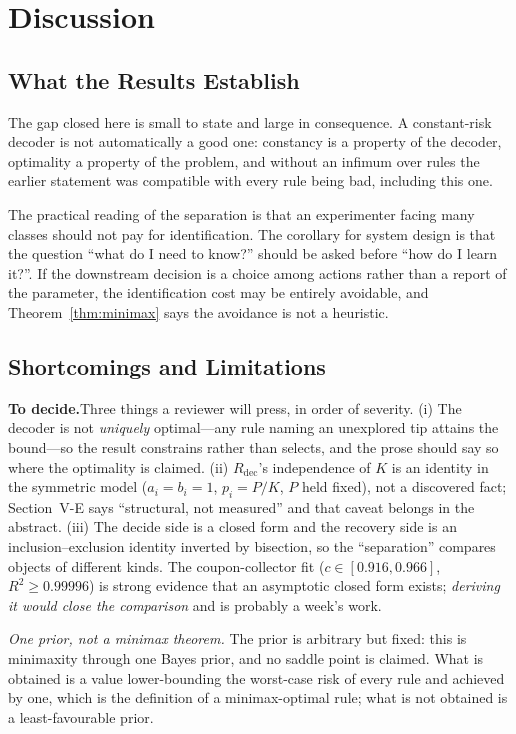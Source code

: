 \documentclass[conference]{IEEEtran}
\theoremstyle{definition}
\newif\ifshownotes\shownotestrue
\newcommand{\TODOPAR}[1]{\ifshownotes\par\vspace{2pt}\noindent%
  {\color{todocol}\textsf{\footnotesize\textbf{To decide.}\;#1}}\par\vspace{2pt}\fi}
\begin{document}
\section{Discussion}
\label{sec:discussion}

\subsection{What the Results Establish}

The gap closed here is small to state and large in consequence. A constant-risk decoder is not
automatically a good one: constancy is a property of the decoder, optimality a property of the
problem, and without an infimum over rules the earlier statement was compatible with every
rule being bad, including this one.

The practical reading of the separation is that an experimenter facing many classes should not
pay for identification. The corollary for system design is that the question ``what do I need
to know?'' should be asked before ``how do I learn it?''. If the downstream decision is a
choice among actions rather than a report of the parameter, the identification cost may be
entirely avoidable, and Theorem~\ref{thm:minimax} says the avoidance is not a heuristic.

\subsection{Shortcomings and Limitations}
\TODOPAR{Three things a reviewer will press, in order of severity. (i) The decoder is
not \emph{uniquely} optimal---any rule naming an unexplored tip attains the bound---so the
result constrains rather than selects, and the prose should say so where the optimality is
claimed. (ii) $R_{\mathrm{dec}}$'s independence of $K$ is an identity in the symmetric model
($a_{i}=b_{i}=1$, $p_{i}=P/K$, $P$ held fixed), not a discovered fact; Section~V-E says
``structural, not measured'' and that caveat belongs in the abstract. (iii) The decide side is
a closed form and the recovery side is an inclusion--exclusion identity inverted by bisection,
so the ``separation'' compares objects of different kinds. The coupon-collector fit
($c\in[0.916,0.966]$, $R^{2}\ge0.99996$) is strong evidence that an asymptotic closed form
exists; \emph{deriving it would close the comparison} and is probably a week's work.}

\emph{One prior, not a minimax theorem.} The prior is arbitrary but fixed: this is minimaxity
through one Bayes prior, and no saddle point is claimed. What is obtained is a value
lower-bounding the worst-case risk of every rule and achieved by one, which is the definition
of a minimax-optimal rule; what is not obtained is a least-favourable prior.
\end{document}
